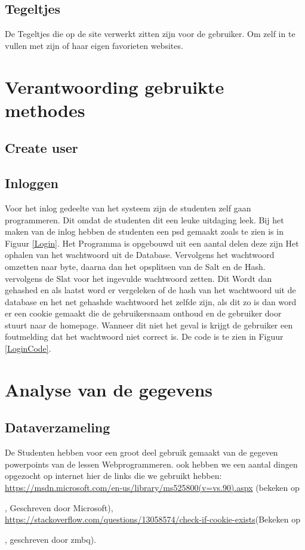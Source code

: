 \documentclass[11pt]{article}
\begin{document}
	\subsection{Tegeltjes}
	De Tegeltjes die op de site verwerkt zitten zijn voor de gebruiker. Om zelf in te vullen met zijn of haar eigen favorieten websites.
	\newpage
	
	\section{Verantwoording gebruikte methodes}
	\subsection{Create user}
	
	\subsection{Inloggen}
	Voor het inlog gedeelte van het systeem zijn de studenten zelf gaan programmeren. Dit omdat de studenten dit een leuke uitdaging leek. Bij het maken van de inlog hebben de studenten een psd gemaakt zoals te zien is in Figuur \ref{Login}. Het Programma is opgebouwd uit een aantal delen deze zijn Het ophalen van het wachtwoord uit de Database. Vervolgens het wachtwoord omzetten naar byte, daarna dan het opsplitsen van de Salt en de Hash. vervolgens de Slat voor het ingevulde wachtwoord zetten. Dit Wordt dan gehashed en als laatst word er vergeleken of de hash van het wachtwoord uit de database en het net gehashde wachtwoord het zelfde zijn, als dit zo is dan word er een cookie gemaakt die de gebruikersnaam onthoud en de gebruiker door stuurt naar de homepage. Wanneer dit niet het geval is krijgt de gebruiker een foutmelding dat het wachtwoord niet correct is. De code is te zien in Figuur \ref{LoginCode}.
	\newpage
	
	\section{Analyse van de gegevens}
	
	\subsection{Dataverzameling}
	De Studenten hebben voor een groot deel gebruik gemaakt van de gegeven powerpoints van de lessen Webprogrammeren. ook hebben we een aantal dingen opgezocht op internet hier de links die we gebruikt hebben: \url{https://msdn.microsoft.com/en-us/library/ms525800(v=vs.90).aspx} (bekeken op \date{19-01-2018}, Geschreven door Microsoft), \newline \url{https://stackoverflow.com/questions/13058574/check-if-cookie-exists}(Bekeken op \date{19-01-2018}, geschreven door zmbq).
	
\end{document}
